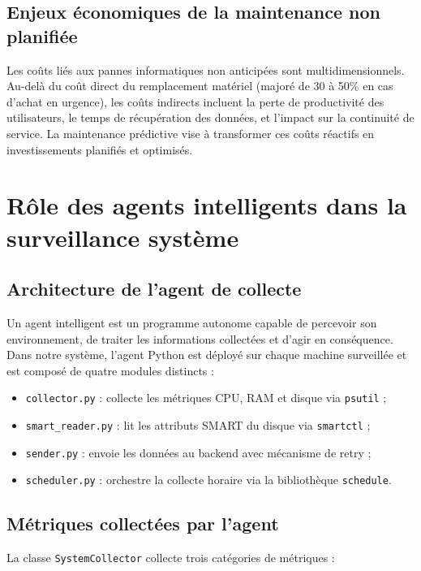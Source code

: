 \subsection{Enjeux économiques de la maintenance non planifiée}

Les coûts liés aux pannes informatiques non anticipées sont multidimensionnels. Au-delà du
coût direct du remplacement matériel (majoré de 30 à 50\% en cas d'achat en urgence), les
coûts indirects incluent la perte de productivité des utilisateurs, le temps de récupération
des données, et l'impact sur la continuité de service. La maintenance prédictive vise à
transformer ces coûts réactifs en investissements planifiés et optimisés.

\section{Rôle des agents intelligents dans la surveillance système}

\subsection{Architecture de l'agent de collecte}

Un agent intelligent est un programme autonome capable de percevoir son environnement,
de traiter les informations collectées et d'agir en conséquence. Dans notre système,
l'agent Python est déployé sur chaque machine surveillée et est composé de quatre modules
distincts :

\begin{itemize}
  \item \texttt{collector.py} : collecte les métriques CPU, RAM et disque via \texttt{psutil} ;
  \item \texttt{smart\_reader.py} : lit les attributs SMART du disque via \texttt{smartctl} ;
  \item \texttt{sender.py} : envoie les données au backend avec mécanisme de retry ;
  \item \texttt{scheduler.py} : orchestre la collecte horaire via la bibliothèque
        \texttt{schedule}.
\end{itemize}

\subsection{Métriques collectées par l'agent}

La classe \texttt{SystemCollector} collecte trois catégories de métriques :

